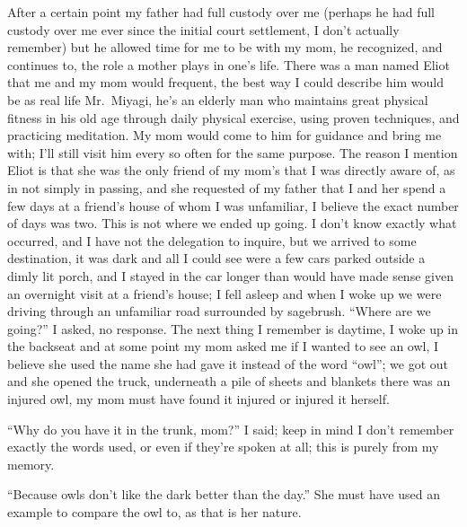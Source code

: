 \documentclass[12pt]{article}
\begin{document}
After a certain point my father had full custody over me (perhaps he had full
custody over me ever since the initial court settlement, I don't actually
remember) but he allowed time for me to be with my mom, he recognized, and
continues to, the role a mother plays in one's life. There was a man named Eliot
that me and my mom would frequent, the best way I could describe him would be as
real life Mr.\ Miyagi, he's an elderly man who maintains great physical fitness
in his old age through daily physical exercise, using proven techniques, and
practicing meditation. My mom would come to him for guidance and bring me with;
I'll still visit him every so often for the same purpose. The reason I mention
Eliot is that she was the only friend of my mom's that I was directly aware of,
as in not simply in passing, and she requested of my father that I and her spend
a few days at a friend's house of whom I was unfamiliar, I believe the exact
number of days was two. This is not where we ended up going. I don't know
exactly what occurred, and I have not the delegation to inquire, but we arrived
to some destination, it was dark and all I could see were a few cars parked
outside a dimly lit porch, and I stayed in the car longer than would have made
sense given an overnight visit at a friend's house; I fell asleep and when
I woke up we were driving through an unfamiliar road surrounded by sagebrush.
``Where are we going?'' I asked, no response. The next thing I remember is
daytime, I woke up in the backseat and at some point my mom asked me if I wanted
to see an owl, I believe she used the name she had gave it instead of the word
``owl''; we got out and she opened the truck, underneath a pile of sheets and
blankets there was an injured owl, my mom must have found it injured or injured
it herself.

``Why do you have it in the trunk, mom?'' I said; keep in mind I don't remember
exactly the words used, or even if they're spoken at all; this is purely from my
memory.

``Because owls don't like the dark better than the day.'' She must have used an
example to compare the owl to, as that is her nature.
\end{document}
